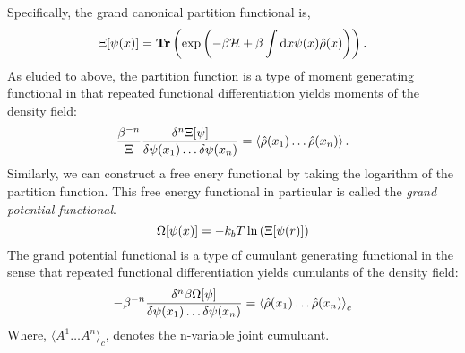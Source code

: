 Specifically, the grand canonical partition functional is,
\begin{equation}
    \Xi[\psi(x)] = \mathbf{Tr}\left( \exp\left(-\beta\mathcal{H} +\beta\int\mathrm{d}x \psi(x) \hat{\rho}(x)\right) \right).
\end{equation}
As eluded to above, the partition function is a type of moment generating functional in that repeated functional differentiation yields moments of the density field:
\begin{equation}
   \frac{\beta^{-n}}{\Xi} \frac{\delta^n \Xi[\psi]}{\delta \psi(x_1) \dots \delta\psi(x_n)} = \left\langle \hat{\rho}(x_1)\dots\hat{\rho}(x_n) \right\rangle.
\end{equation}
Similarly, we can construct a free enery functional by taking the logarithm of the partition function. This free energy functional in particular is called the \textit{grand potential functional}.
\begin{equation}
    \Omega[\psi(x)] = -k_bT\ln\left(\Xi[\psi(r)]\right)
\end{equation}
The grand potential functional is a type of cumulant generating functional in the sense that repeated functional differentiation yields cumulants of the density field:
\begin{equation}
    -\beta^{-n}\frac{\delta^n \beta\Omega[\psi]}{\delta\psi(x_1)\dots\delta\psi(x_n)} = \left\langle \hat{\rho}(x_1)\dots\hat{\rho}(x_n) \right\rangle_c
\end{equation}
Where, $\langle A^1\dots A^n \rangle_c$, denotes the n-variable joint cumuluant.

